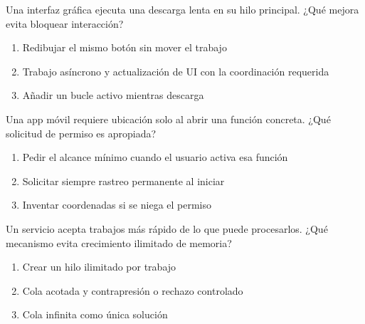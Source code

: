 \noindent\begin{minipage}{\linewidth}\setlength{\parskip}{4pt}\label{q:S-055}
Una interfaz gráfica ejecuta una descarga lenta en su hilo principal. ¿Qué mejora evita bloquear interacción?
\begin{enumerate}[label=\Alph*),nosep]
\item Redibujar el mismo botón sin mover el trabajo
\item Trabajo asíncrono y actualización de UI con la coordinación requerida
\item Añadir un bucle activo mientras descarga
\end{enumerate}\end{minipage}\par\medskip

\noindent\begin{minipage}{\linewidth}\setlength{\parskip}{4pt}\label{q:S-056}
Una app móvil requiere ubicación solo al abrir una función concreta. ¿Qué solicitud de permiso es apropiada?
\begin{enumerate}[label=\Alph*),nosep]
\item Pedir el alcance mínimo cuando el usuario activa esa función
\item Solicitar siempre rastreo permanente al iniciar
\item Inventar coordenadas si se niega el permiso
\end{enumerate}\end{minipage}\par\medskip

\noindent\begin{minipage}{\linewidth}\setlength{\parskip}{4pt}\label{q:S-057}
Un servicio acepta trabajos más rápido de lo que puede procesarlos. ¿Qué mecanismo evita crecimiento ilimitado de memoria?
\begin{enumerate}[label=\Alph*),nosep]
\item Crear un hilo ilimitado por trabajo
\item Cola acotada y contrapresión o rechazo controlado
\item Cola infinita como única solución
\end{enumerate}\end{minipage}\par\medskip

